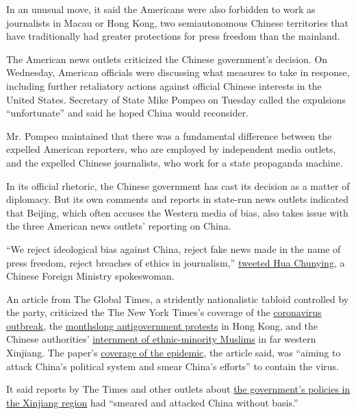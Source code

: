 In an unusual move, it said the Americans were also forbidden to work as
journalists in Macau or Hong Kong, two semiautonomous Chinese
territories that have traditionally had greater protections for press
freedom than the mainland.

The American news outlets criticized the Chinese government's decision.
On Wednesday, American officials were discussing what measures to take
in response, including further retaliatory actions against official
Chinese interests in the United States. Secretary of State Mike Pompeo
on Tuesday called the expulsions ``unfortunate'' and said he hoped China
would reconsider.

Mr. Pompeo maintained that there was a fundamental difference between
the expelled American reporters, who are employed by independent media
outlets, and the expelled Chinese journalists, who work for a state
propaganda machine.

In its official rhetoric, the Chinese government has cast its decision
as a matter of diplomacy. But its own comments and reports in state-run
news outlets indicated that Beijing, which often accuses the Western
media of bias, also takes issue with the three American news outlets'
reporting on China.

``We reject ideological bias against China, reject fake news made in the
name of press freedom, reject breaches of ethics in journalism,''
\href{https://twitter.com/SpokespersonCHN/status/1240067426684788736}{tweeted
Hua Chunying}, a Chinese Foreign Ministry spokeswoman.

An article from The Global Times, a stridently nationalistic tabloid
controlled by the party, criticized the The New York Times's coverage of
the
\href{https://www.nytimes3xbfgragh.onion/2020/03/07/world/asia/china-coronavirus-cost.html}{coronavirus
outbreak}, the
\href{https://www.nytimes3xbfgragh.onion/2019/12/07/world/asia/hong-kong-protests-us-chamber-commerce.html}{monthslong
antigovernment protests} in Hong Kong, and the Chinese authorities'
\href{https://www.nytimes3xbfgragh.onion/interactive/2019/11/16/world/asia/china-xinjiang-documents.html}{internment
of ethnic-minority Muslims} in far western Xinjiang. The paper's
\href{https://www.nytimes3xbfgragh.onion/2020/02/01/world/asia/china-coronavirus.html}{coverage
of the epidemic}, the article said, was ``aiming to attack China's
political system and smear China's efforts'' to contain the virus.

It said reports by The Times and other outlets about
\href{https://www.nytimes3xbfgragh.onion/2019/11/24/world/asia/leak-chinas-internment-camps.html}{the
government's policies in the Xinjiang region} had ``smeared and attacked
China without basis.''

